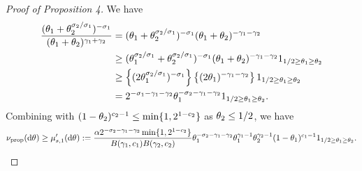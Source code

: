 \begin{proof}[Proof of Proposition 4]
We have 
\begin{align*}
    \frac{(\variantfreqperpop{1}+\variantfreqperpop{2}^{\rate{2}/\rate{1}})^{-\rate{1}}}{(\variantfreqperpop{1}+\variantfreqperpop{2})^{\corr{1}+\corr{2}}}&=(\variantfreqperpop{1}+\variantfreqperpop{2}^{\rate{2}/\rate{1}})^{-\rate{1}}(\variantfreqperpop{1}+\variantfreqperpop{2})^{-\corr{1}-\corr{2}}\\
    &\ge (\variantfreqperpop{1}^{\rate{2}/\rate{1}}+\variantfreqperpop{2}^{\rate{2}/\rate{1}})^{-\rate{1}}(\variantfreqperpop{1}+\variantfreqperpop{2})^{-\corr{1}-\corr{2}}\bm{1}_{1/2 \ge \variantfreqperpop{1}\ge \variantfreqperpop{2} }\\
    &\ge \left\{ (2\variantfreqperpop{1}^{\rate{2}/\rate{1}} )^{-\rate{1}} \right\} \left\{(2\variantfreqperpop{1})^{-\corr{1} - \corr{2}} \right\}\bm{1}_{1/2 \ge \variantfreqperpop{1}\ge \variantfreqperpop{2} } \\
    &= 2^{-\rate{1}-\corr{1}-\corr{2}} \variantfreqperpop{1}^{-\rate{2}-\corr{1}-\corr{2}}\bm{1}_{1/2 \ge \variantfreqperpop{1}\ge \variantfreqperpop{2} }.
\end{align*}
Combining with $(1-\theta_{2})^{c_{2}-1}\le \min\{1, 2^{1-c_{2}}\}$ as $\theta_{2}\le 1/2$, we have 
\begin{align*}
    \ratemeasproposed(\de\vecvariantfreq{})\ge\mu'_{s,1}(\de\vecvariantfreq{}):= \frac{\mass 2^{-\rate{2}-\corr{1}-\corr{2}}\min\{1, 2^{1-\conc{2}}\}}{B(\corr{1}, \conc{1})B(\corr{2}, \conc{2})}\variantfreqperpop{1}^{-\rate{2}-\corr{1}-\corr{2}} \variantfreqperpop{1}^{\corr{1}-1}\variantfreqperpop{2}^{\corr{2}-1}(1-\variantfreqperpop{1})^{\conc{1}-1} \bm{1}_{1/2 \ge \variantfreqperpop{1} \ge \variantfreqperpop{2}}.
\end{align*} 


\end{proof}
